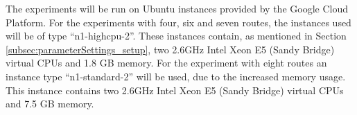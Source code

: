 The experiments will be run on Ubuntu instances provided by the Google Cloud Platform\citep{website:google}. For the experiments with four, six and seven routes, the instances used will be of type ``n1-highcpu-2''. These instances contain, as mentioned in Section \vref{subsec:parameterSettings_setup}, two 2.6GHz Intel Xeon E5 (Sandy Bridge) virtual CPUs and 1.8 GB memory. For the experiment with eight routes an instance type ``n1-standard-2'' will be used, due to the increased memory usage. This instance contains two 2.6GHz Intel Xeon E5 (Sandy Bridge) virtual CPUs and 7.5 GB memory.

